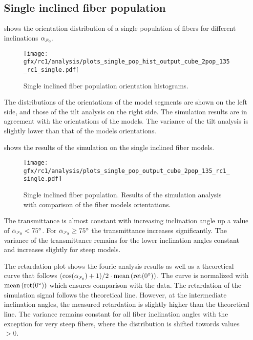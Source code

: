 \subsection{Single inclined fiber population}
\label{sec:resSingleIncl}
%
 shows the orientation distribution of a single population of fibers for different inclinations $\modelInc{}$.
% 
\begin{figure}[!t]
    \centering
    \texttt{[image: gfx/rc1/analysis/plots\_single\_pop\_hist\_output\_cube\_2pop\_135\_rc1\_single.pdf]}
    \caption{Single inclined fiber population orientation histograms. }
    \label{fig:single_fiber_pop_hist}
\end{figure}
% 
The distributions of the orientations of the model segments are shown on the left side, and those of the tilt analysis on the right side.
The simulation results are in agreement with the orientations of the models.
The variance of the tilt analysis is slightly lower than that of the models orientations.
\par
% 
 shows the results of the simulation on the single inclined fiber models.
\par
% 
\begin{figure}[!p]
    \centering
    \texttt{[image: gfx/rc1/analysis/plots\_single\_pop\_output\_cube\_2pop\_135\_rc1\_single.pdf]}
    \caption{Single inclined fiber population. Results of the simulation analysis with comparison of the fiber models orientations.}
    \label{fig:single_fiber_pop_rofl}
\end{figure}
% 
The transmittance is almost constant with increasing inclination angle up a value of $\modelInc<\SI{75}{\degree}$.
For $\modelInc \ge \SI{75}{\degree}$ the transmittance increases significantly.
The variance of the transmittance  remains for the lower inclination angles constant and increases slightly for steep models.
\par
%
The retardation plot shows the fourie analysis results as well as a theoretical curve that follows $(\cos(\modelInc) + 1) / 2 \cdot \mean\left(\mathrm{ret}(\SI{0}{\degree})\right)$.
The curve is normalized with $\operatorname{mean}\left(\mathrm{ret}(\SI{0}{\degree})\right)$ which ensures comparison with the data.
The retardation of the simulation signal follows the theoretical line.
However, at the intermediate inclination angles, the measured retardation is slightly higher than the theoretical line.
The variance remains constant for all fiber inclination angles \modelInc{} with the exception for very steep fibers, where the distribution is shifted towords values $>0$.
